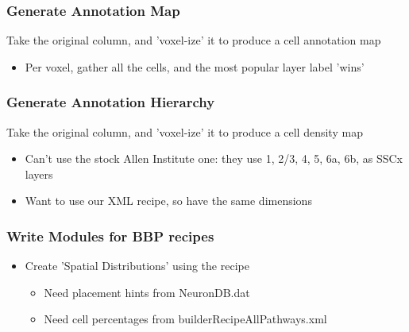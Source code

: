 \documentclass{beamer}
\begin{document}
\begin{frame}
  \frametitle{Generate Annotation Map}
  Take the original column, and 'voxel-ize' it to produce a cell annotation map
  \begin{itemize}
     \item Per voxel, gather all the cells, and the most popular layer label 'wins'
  \end{itemize}
\end{frame}

\begin{frame}[fragile]
  \frametitle{Generate Annotation Hierarchy}
  Take the original column, and 'voxel-ize' it to produce a cell density map
  \begin{itemize}
     \item Can't use the stock Allen Institute one: they use 1, 2/3, 4, 5, 6a, 6b, as SSCx layers
     \item Want to use our XML recipe, so have the same dimensions
  \end{itemize}
  
\end{frame}

\begin{frame}
   \frametitle{Write Modules for BBP recipes}
  \begin{itemize}
     \item Create 'Spatial Distributions' using the recipe
     \begin{itemize}
        \item Need placement hints from NeuronDB.dat
        \item Need cell percentages from builderRecipeAllPathways.xml
     \end{itemize}
  \end{itemize}
\end{frame}
\end{document}
